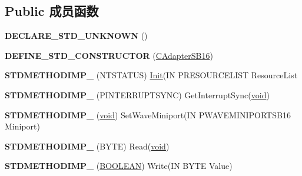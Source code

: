 \subsection*{Public 成员函数}
\begin{DoxyCompactItemize}
\item 
\mbox{\label{class_c_adapter_s_b16_abd02d51a322d118af6657c73e393af07}} 
{\bfseries D\+E\+C\+L\+A\+R\+E\+\_\+\+S\+T\+D\+\_\+\+U\+N\+K\+N\+O\+WN} ()
\item 
\mbox{\label{class_c_adapter_s_b16_af2109507e0f84482f3546bb4df13657f}} 
{\bfseries D\+E\+F\+I\+N\+E\+\_\+\+S\+T\+D\+\_\+\+C\+O\+N\+S\+T\+R\+U\+C\+T\+OR} (\hyperlink{class_c_adapter_s_b16}{C\+Adapter\+S\+B16})
\item 
\mbox{\label{class_c_adapter_s_b16_af8a4b2dc16ac62cb14424260fec2aafc}} 
{\bfseries S\+T\+D\+M\+E\+T\+H\+O\+D\+I\+M\+P\+\_\+} (N\+T\+S\+T\+A\+T\+US) \hyperlink{class_init}{Init}(IN P\+R\+E\+S\+O\+U\+R\+C\+E\+L\+I\+ST Resource\+List
\item 
\mbox{\label{class_c_adapter_s_b16_ae319b712bc2eb469e813f7759d7bf861}} 
{\bfseries S\+T\+D\+M\+E\+T\+H\+O\+D\+I\+M\+P\+\_\+} (P\+I\+N\+T\+E\+R\+R\+U\+P\+T\+S\+Y\+NC) Get\+Interrupt\+Sync(\hyperlink{interfacevoid}{void})
\item 
\mbox{\label{class_c_adapter_s_b16_a687f6752bcdf986d93ed1f9d541a568e}} 
{\bfseries S\+T\+D\+M\+E\+T\+H\+O\+D\+I\+M\+P\+\_\+} (\hyperlink{interfacevoid}{void}) Set\+Wave\+Miniport(IN P\+W\+A\+V\+E\+M\+I\+N\+I\+P\+O\+R\+T\+S\+B16 Miniport)
\item 
\mbox{\label{class_c_adapter_s_b16_a297a7b785d94e0f2788eef2a51db10d2}} 
{\bfseries S\+T\+D\+M\+E\+T\+H\+O\+D\+I\+M\+P\+\_\+} (B\+Y\+TE) Read(\hyperlink{interfacevoid}{void})
\item 
\mbox{\label{class_c_adapter_s_b16_a36f78c4088a04ba90906496144fa8034}} 
{\bfseries S\+T\+D\+M\+E\+T\+H\+O\+D\+I\+M\+P\+\_\+} (\hyperlink{_processor_bind_8h_a112e3146cb38b6ee95e64d85842e380a}{B\+O\+O\+L\+E\+AN}) Write(IN B\+Y\+TE Value)
\item 
\mbox{\label{class_c_adapter_s_b16_a506ec10f948c8648eba299711e78f82f}} 

\end{DoxyCompactItemize}
